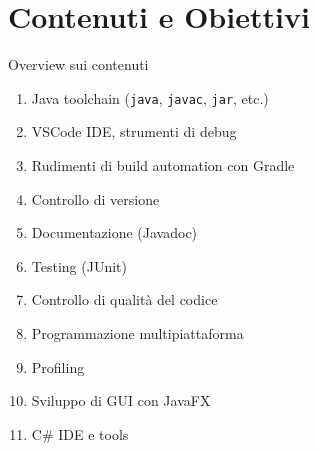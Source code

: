 \documentclass[xcolor=dvipsnames,presentation]{beamer}
\begin{document}
\section{Contenuti e Obiettivi}

\begin{frame}{Overview sui contenuti}

\begin{enumerate}
    \item Java toolchain (\texttt{java}, \texttt{javac}, \texttt{jar}, etc.)
    \item VSCode IDE, strumenti di debug
    \item Rudimenti di build automation con Gradle
    \item Controllo di versione
    \item Documentazione (Javadoc)
    \item Testing (JUnit)
    \item Controllo di qualità del codice
    \item Programmazione multipiattaforma
    \item Profiling
    \item Sviluppo di GUI con JavaFX
    \item C\# IDE e tools
\end{enumerate}

\end{frame}
\end{document}
